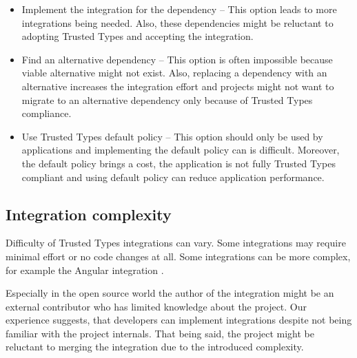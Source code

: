 \begin{itemize}
  \item Implement the integration for the dependency -- This option leads to more integrations being
        needed. Also, these dependencies might be reluctant to adopting Trusted Types and accepting
        the integration.
  \item Find an alternative dependency -- This option is often impossible because viable alternative
        might not exist. Also, replacing a dependency with an alternative increases the integration
        effort and projects might not want to migrate to an alternative dependency only because of
        Trusted Types compliance.
  \item Use Trusted Types default policy -- This option should only be used by applications and
        implementing the default policy can is difficult. Moreover, the default policy brings a
        cost, the application is not fully Trusted Types compliant and using default policy can
        reduce application performance.
\end{itemize}

\subsection{Integration complexity}
\label{sub:trust_integration_author}

Difficulty of Trusted Types integrations can vary. Some integrations may require minimal effort or
no code changes at all. Some integrations can be more complex, for example the Angular integration
\cite{tt_web_framework_paper}.

Especially in the open source world the author of the integration might be an external contributor
who has limited knowledge about the project. Our experience suggests, that developers can implement
integrations despite not being familiar with the project internals. That being said, the project
might be reluctant to merging the integration due to the introduced complexity.
